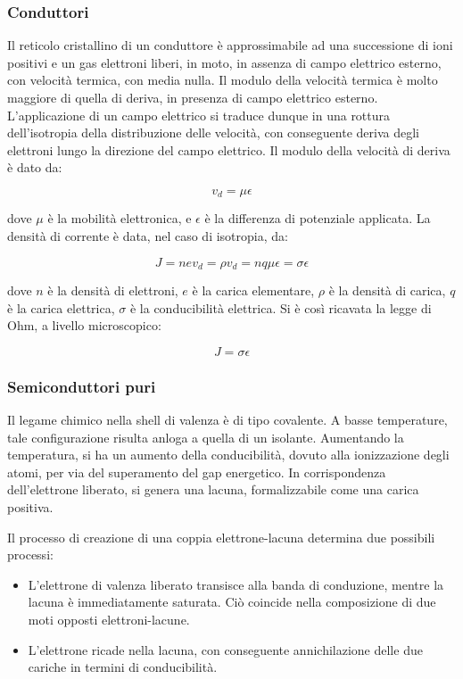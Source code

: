 \documentclass{article}
\begin{document}
\subsubsection{Conduttori}
Il reticolo cristallino di un conduttore è approssimabile ad una successione di ioni positivi e un gas elettroni liberi,
in moto, in assenza di campo elettrico esterno, con velocità termica, con media nulla.
Il modulo della velocità termica è molto maggiore di quella di deriva, in presenza di campo elettrico esterno.
L'applicazione di un campo elettrico si traduce dunque in una rottura dell'isotropia della distribuzione delle velocità, con conseguente deriva degli elettroni
lungo la direzione del campo elettrico.
Il modulo della velocità di deriva è dato da:

\begin{equation}
    v_d = \mu \epsilon
\end{equation}

dove $\mu$ è la mobilità elettronica, e $\epsilon$ è la differenza di potenziale applicata.
La densità di corrente è data, nel caso di isotropia, da:

\begin{equation}
    J = n e v_d= \rho v_d=n q \mu \epsilon= \sigma \epsilon
\end{equation}

dove $n$ è la densità di elettroni, $e$ è la carica elementare, $\rho$ è la densità di carica, $q$ è la carica elettrica, $\sigma$ è la conducibilità elettrica.
Si è così ricavata la legge di Ohm, a livello microscopico:

\begin{equation}
    J = \sigma \epsilon
\end{equation}
\subsubsection{Semiconduttori puri}
Il legame chimico nella shell di valenza è di tipo covalente.
A basse temperature, tale configurazione risulta anloga a quella di un isolante.
Aumentando la temperatura, si ha un aumento della conducibilità, dovuto alla ionizzazione degli atomi,
per via del superamento del gap energetico.
In corrispondenza dell'elettrone liberato, si genera una lacuna, formalizzabile come una carica positiva.

Il processo di creazione di una coppia elettrone-lacuna determina due possibili processi:

\begin{itemize}
    \item L'elettrone di valenza liberato transisce alla banda di conduzione, mentre la lacuna è immediatamente saturata.
    Ciò coincide nella composizione di due moti opposti elettroni-lacune.
    \item L'elettrone ricade nella lacuna, con conseguente annichilazione delle due cariche in termini di conducibilità.
\end{itemize}
\end{document}
